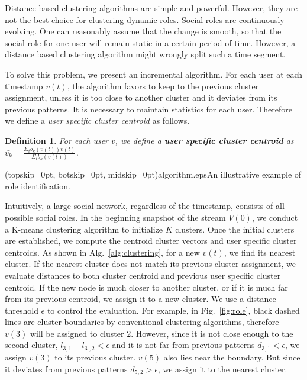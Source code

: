 \documentclass{ieeeaccess}
\newtheorem{myDef}{Definition}
\begin{document}
Distance based clustering algorithms are simple and powerful. However, they are not the best choice for clustering dynamic roles. Social roles are continuously evolving. One can reasonably assume that the change is smooth, so that the social role for one user will remain static in a certain period of time. However, a distance based clustering algorithm might wrongly split such a time segment.

To solve this problem, we present an incremental algorithm. For each user at each timestamp $v(t)$, the algorithm favors to keep to the previous cluster assignment, unless it is too close to another cluster and it deviates from its previous patterns. It is necessary to  maintain statistics for each user. Therefore we define a \textit{user specific cluster centroid} as follows.

\begin{myDef}
For each user $v$, we define a \textbf{user specific cluster centroid} as $\bar{v_k}=\frac{\Sigma_{t}b_k(v(t)) v(t)}{\Sigma_t b_k(v(t))} $.
\end{myDef}

\Figure[t!](topskip=0pt, botskip=0pt, midskip=0pt){algorithm.eps}{An illustrative example of role identification. \label{fig:role}
}

Intuitively, a large social network, regardless of the timestamp, consists of all possible social roles. In the beginning snapshot of the stream $V(0)$,  we conduct a K-means clustering algorithm to initialize $K$ clusters. Once the initial clusters are established, we compute the centroid cluster vectors and user specific cluster centroids. As shown in Alg.~\ref{alg:clustering}, for a new $v(t)$, we find its nearest cluster. If the nearest cluster does not match its previous cluster assignment, we evaluate distances to both cluster centroid and previous user specific cluster centroid. If the new node is much closer to another cluster, or if it is much far from its previous centroid, we assign it to a new cluster. We use a distance threshold $\epsilon$ to control the evaluation. For example, in Fig.~\ref{fig:role}, black dashed lines are cluster boundaries by conventional clustering algorithms, therefore $v(3)$ will be assigned to cluster $2$. However, since it is not close enough to the second cluster, $l_{3,1}-l_{3.,2} <\epsilon$ and it is not far from previous patterns $d_{3,1}<\epsilon$, we assign $v(3)$ to its previous cluster.  $v(5)$ also lies near the boundary. But since it deviates from previous patterns $d_{5,2}>\epsilon$, we assign it to the nearest cluster.
\end{document}
